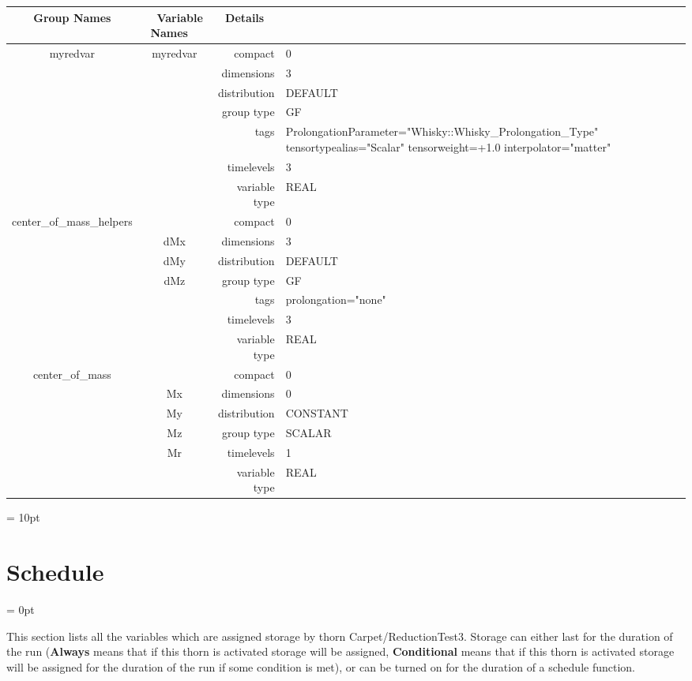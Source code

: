 \vspace{5mm}

\begin{tabular*}{150mm}{|c|c@{\extracolsep{\fill}}|rl|} \hline 
~ {\bf Group Names} ~ & ~ {\bf Variable Names} ~  &{\bf Details} ~ & ~\\ 
\hline 
myredvar & myredvar & compact & 0 \\ 
 &  & dimensions & 3 \\ 
 &  & distribution & DEFAULT \\ 
 &  & group type & GF \\ 
 &  & tags & ProlongationParameter="Whisky::Whisky\_Prolongation\_Type" tensortypealias="Scalar" tensorweight=+1.0 interpolator="matter" \\ 
 &  & timelevels & 3 \\ 
 &  & variable type & REAL \\ 
\hline 
center\_of\_mass\_helpers &  & compact & 0 \\ 
 & dMx & dimensions & 3 \\ 
 & dMy & distribution & DEFAULT \\ 
 & dMz & group type & GF \\ 
 &  & tags & prolongation="none" \\ 
 &  & timelevels & 3 \\ 
 &  & variable type & REAL \\ 
\hline 
center\_of\_mass &  & compact & 0 \\ 
 & Mx & dimensions & 0 \\ 
 & My & distribution & CONSTANT \\ 
 & Mz & group type & SCALAR \\ 
 & Mr & timelevels & 1 \\ 
 &  & variable type & REAL \\ 
\hline 
\end{tabular*} 



\vspace{5mm}\parskip = 10pt 

\section{Schedule} 


\parskip = 0pt


\noindent This section lists all the variables which are assigned storage by thorn Carpet/ReductionTest3.  Storage can either last for the duration of the run ({\bf Always} means that if this thorn is activated storage will be assigned, {\bf Conditional} means that if this thorn is activated storage will be assigned for the duration of the run if some condition is met), or can be turned on for the duration of a schedule function.


